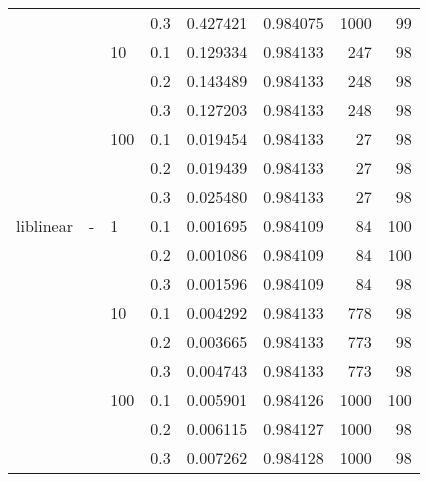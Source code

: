 \begin{table}[H]
\begin{tabular}{llllrrrr}
          &   &     & 0.3 &  0.427421 &  0.984075 &    1000 &    99 \\
          &   & 10  & 0.1 &  0.129334 &  0.984133 &     247 &    98 \\
          &   &     & 0.2 &  0.143489 &  0.984133 &     248 &    98 \\
          &   &     & 0.3 &  0.127203 &  0.984133 &     248 &    98 \\
          &   & 100 & 0.1 &  0.019454 &  0.984133 &      27 &    98 \\
          &   &     & 0.2 &  0.019439 &  0.984133 &      27 &    98 \\
          &   &     & 0.3 &  0.025480 &  0.984133 &      27 &    98 \\
liblinear & - & 1   & 0.1 &  0.001695 &  0.984109 &      84 &   100 \\
          &   &     & 0.2 &  0.001086 &  0.984109 &      84 &   100 \\
          &   &     & 0.3 &  0.001596 &  0.984109 &      84 &    98 \\
          &   & 10  & 0.1 &  0.004292 &  0.984133 &     778 &    98 \\
          &   &     & 0.2 &  0.003665 &  0.984133 &     773 &    98 \\
          &   &     & 0.3 &  0.004743 &  0.984133 &     773 &    98 \\
          &   & 100 & 0.1 &  0.005901 &  0.984126 &    1000 &   100 \\
          &   &     & 0.2 &  0.006115 &  0.984127 &    1000 &    98 \\
          &   &     & 0.3 &  0.007262 &  0.984128 &    1000 &    98 \\
\bottomrule
\end{tabular}
\end{table}
